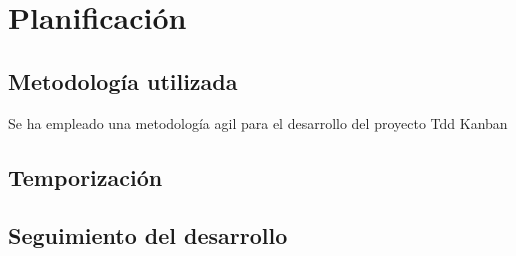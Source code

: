 \chapter{Planificación}

\section{Metodología utilizada}
    Se ha empleado una metodología agil para el desarrollo del proyecto
    Tdd Kanban

\section{Temporización}

\section{Seguimiento del desarrollo}
